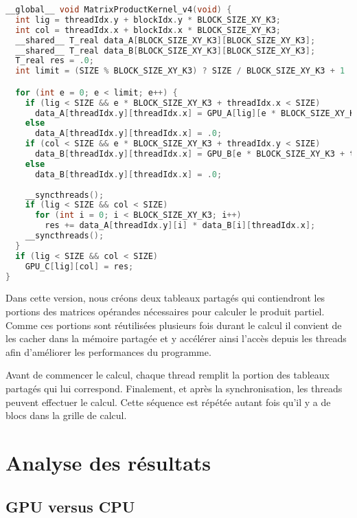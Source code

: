 \documentclass[11pt, twocolumn]{article}
\begin{document}
\begin{lstlisting}[language=C, morekeywords={__global__, __shared__}, label={listage:K4code}, caption={Implémentation du noyau \textit{K4}}]
__global__ void MatrixProductKernel_v4(void) {
  int lig = threadIdx.y + blockIdx.y * BLOCK_SIZE_XY_K3;
  int col = threadIdx.x + blockIdx.x * BLOCK_SIZE_XY_K3;
  __shared__ T_real data_A[BLOCK_SIZE_XY_K3][BLOCK_SIZE_XY_K3];
  __shared__ T_real data_B[BLOCK_SIZE_XY_K3][BLOCK_SIZE_XY_K3];
  T_real res = .0;
  int limit = (SIZE % BLOCK_SIZE_XY_K3) ? SIZE / BLOCK_SIZE_XY_K3 + 1 : SIZE / BLOCK_SIZE_XY_K3;

  for (int e = 0; e < limit; e++) {
    if (lig < SIZE && e * BLOCK_SIZE_XY_K3 + threadIdx.x < SIZE) 
      data_A[threadIdx.y][threadIdx.x] = GPU_A[lig][e * BLOCK_SIZE_XY_K3 + threadIdx.x];
    else
      data_A[threadIdx.y][threadIdx.x] = .0; 
    if (col < SIZE && e * BLOCK_SIZE_XY_K3 + threadIdx.y < SIZE) 
      data_B[threadIdx.y][threadIdx.x] = GPU_B[e * BLOCK_SIZE_XY_K3 + threadIdx.y][col];
    else
      data_B[threadIdx.y][threadIdx.x] = .0;
      
    __syncthreads();
    if (lig < SIZE && col < SIZE)
      for (int i = 0; i < BLOCK_SIZE_XY_K3; i++) 
        res += data_A[threadIdx.y][i] * data_B[i][threadIdx.x];
    __syncthreads();
  }
  if (lig < SIZE && col < SIZE)
    GPU_C[lig][col] = res;
}
\end{lstlisting}

Dans cette version, nous créons deux tableaux partagés qui contiendront les portions des matrices opérandes nécessaires pour calculer le produit partiel. Comme ces portions sont réutilisées plusieurs fois durant le calcul il convient de les cacher dans la mémoire partagée et y accélérer ainsi l'accès depuis les threads afin d'améliorer les performances du programme.

\par Avant de commencer le calcul, chaque thread remplit la portion des tableaux partagés qui lui correspond. Finalement, et après la synchronisation, les threads peuvent effectuer le calcul. Cette séquence est répétée autant fois qu'il y a de blocs dans la grille de calcul.  

\section{Analyse des résultats}
\label{section:analyse_resultats} 

\subsection{GPU versus CPU}
\end{document}
